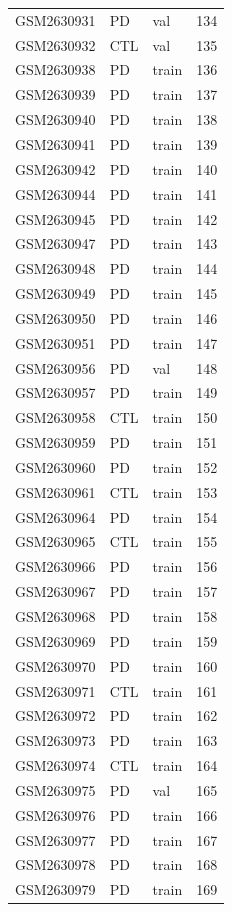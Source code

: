 \begin{footnotesize}
\begin{longtable}{llll}
GSM2630931 & PD & val & 134 \\
GSM2630932 & CTL & val & 135 \\
GSM2630938 & PD & train & 136 \\
GSM2630939 & PD & train & 137 \\
GSM2630940 & PD & train & 138 \\
GSM2630941 & PD & train & 139 \\
GSM2630942 & PD & train & 140 \\
GSM2630944 & PD & train & 141 \\
GSM2630945 & PD & train & 142 \\
GSM2630947 & PD & train & 143 \\
GSM2630948 & PD & train & 144 \\
GSM2630949 & PD & train & 145 \\
GSM2630950 & PD & train & 146 \\
GSM2630951 & PD & train & 147 \\
GSM2630956 & PD & val & 148 \\
GSM2630957 & PD & train & 149 \\
GSM2630958 & CTL & train & 150 \\
GSM2630959 & PD & train & 151 \\
GSM2630960 & PD & train & 152 \\
GSM2630961 & CTL & train & 153 \\
GSM2630964 & PD & train & 154 \\
GSM2630965 & CTL & train & 155 \\
GSM2630966 & PD & train & 156 \\
GSM2630967 & PD & train & 157 \\
GSM2630968 & PD & train & 158 \\
GSM2630969 & PD & train & 159 \\
GSM2630970 & PD & train & 160 \\
GSM2630971 & CTL & train & 161 \\
GSM2630972 & PD & train & 162 \\
GSM2630973 & PD & train & 163 \\
GSM2630974 & CTL & train & 164 \\
GSM2630975 & PD & val & 165 \\
GSM2630976 & PD & train & 166 \\
GSM2630977 & PD & train & 167 \\
GSM2630978 & PD & train & 168 \\
GSM2630979 & PD & train & 169 \\

\end{longtable}
\end{footnotesize}
